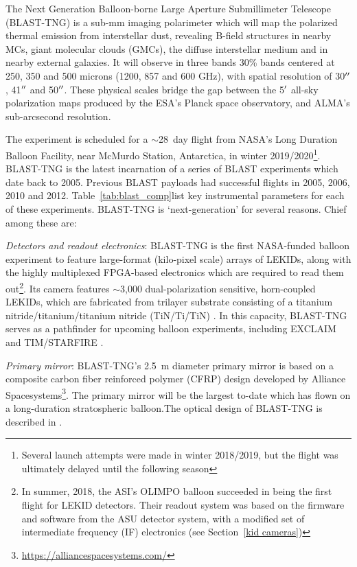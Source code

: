 {The Next Generation Balloon-borne Large Aperture Submillimeter Telescope (BLAST-TNG) is a sub-mm imaging polarimeter which will map the polarized thermal emission from interstellar dust, revealing B-field structures in nearby MCs, giant molecular clouds (GMCs), the diffuse interstellar medium and in nearby external galaxies. It will observe in three bands 30\% bands centered at 250, 350 and 500 microns (1200, 857 and 600 GHz), with spatial resolution of 30$\operatorname{^{\prime\prime}}$, 41$\operatorname{^{\prime\prime}}$ and 50$\operatorname{^{\prime\prime}}$. These physical scales bridge the gap between the 5$\operatorname{^{\prime}}$ all-sky polarization maps produced by the ESA's Planck space observatory, and ALMA's sub-arcsecond resolution.

The experiment is scheduled for a $\sim$28~day flight from NASA's Long Duration Balloon Facility, near McMurdo Station, Antarctica, in winter 2019/2020\footnote{Several launch attempts were made in winter 2018/2019, but the flight was ultimately delayed until the following season}. BLAST-TNG is the latest incarnation of a series of BLAST experiments which date back to 2005. Previous BLAST payloads had successful flights in 2005, 2006, 2010 and 2012. Table~\ref{tab:blast_comp}list key instrumental parameters for each of these experiments. BLAST-TNG is `next-generation' for several reasons. Chief among these are:

\vspace{5mm}

\textit{Detectors and readout electronics}: BLAST-TNG is the first NASA-funded balloon experiment to feature large-format (kilo-pixel scale) arrays of LEKIDs, along with the highly multiplexed FPGA-based electronics which are required to read them out\footnote{In summer, 2018, the ASI's OLIMPO balloon succeeded in being the first flight for LEKID detectors. Their readout system was based on the firmware and software from the ASU detector system, with a modified set of intermediate frequency (IF) electronics (see Section~\ref{kid cameras})}. Its camera features $\sim$3,000 dual-polarization sensitive, horn-coupled LEKIDs, which are fabricated from trilayer substrate consisting of a titanium nitride/titanium/titanium nitride (TiN/Ti/TiN) \citep{hubmayr2014dual}. In this capacity, BLAST-TNG serves as a pathfinder for upcoming balloon experiments, including EXCLAIM \citep{switzer2017measuring} and TIM/STARFIRE \citep{aguirre2018starfire}.

\vspace{5mm}

\textit{Primary mirror}: BLAST-TNG's 2.5~m diameter primary mirror is based on a composite carbon fiber reinforced polymer (CFRP) design developed by Alliance Spacesystems\footnote{\url{https://alliancespacesystems.com/}}. The primary mirror will be the largest to-date which has flown on a long-duration stratospheric balloon.The optical design of BLAST-TNG is described in \citet{lourie2018design}.

}
